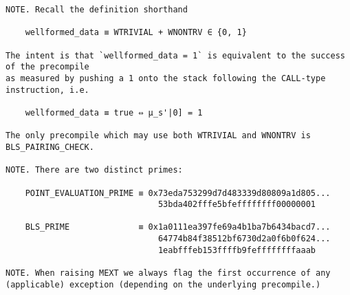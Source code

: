 \documentclass[varwidth=\maxdimen,margin=0.5cm,multi={verbatim}]{standalone}
\begin{document}
\begin{verbatim}
NOTE. Recall the definition shorthand

    wellformed_data ≡ WTRIVIAL + WNONTRV ∈ {0, 1}

The intent is that `wellformed_data = 1` is equivalent to the success of the precompile
as measured by pushing a 1 onto the stack following the CALL-type instruction, i.e.

    wellformed_data ≡ true ⇔ μ_s'|0] = 1

The only precompile which may use both WTRIVIAL and WNONTRV is BLS_PAIRING_CHECK.

NOTE. There are two distinct primes:

    POINT_EVALUATION_PRIME ≡ 0x73eda753299d7d483339d80809a1d805...
                               53bda402fffe5bfeffffffff00000001

    BLS_PRIME              ≡ 0x1a0111ea397fe69a4b1ba7b6434bacd7...
                               64774b84f38512bf6730d2a0f6b0f624...
                               1eabfffeb153ffffb9feffffffffaaab

NOTE. When raising MEXT we always flag the first occurrence of any (applicable) exception (depending on the underlying precompile.)

\end{verbatim}
\end{document}
